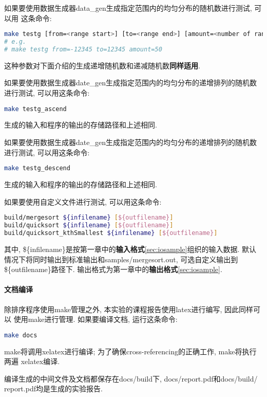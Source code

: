 如果要使用数据生成器data\_gen生成指定范围内的均匀分布的随机数进行测试, 可以用
这条命令:
\begin{lstlisting}[language=bash]
make testg [from=<range start>] [to=<range end>] [amount=<number of random numbers>]
# e.g. 
# make testg from=-12345 to=12345 amount=50
\end{lstlisting}
这种参数对下面介绍的生成递增随机数和递减随机数\textbf{同样适用}.\par

如果要使用数据生成器date\_gen生成指定范围内的均匀分布的递增排列的随机数进行测试,
可以用这条命令:
\begin{lstlisting}[language=bash]
make testg_ascend
\end{lstlisting}
生成的输入和程序的输出的存储路径和上述相同.\par

如果要使用数据生成器date\_gen生成指定范围内的均匀分布的递增排列的随机数进行测试,
可以用这条命令:
\begin{lstlisting}[language=bash]
make testg_descend
\end{lstlisting}
生成的输入和程序的输出的存储路径和上述相同.\par

如果要使用自定义文件进行测试, 可以用这条命令:
\begin{lstlisting}[language=bash]
build/mergesort ${infilename} [${outfilename}]
build/quicksort ${infilename} [${outfilename}]
build/quicksort_kthSmallest ${infilename} [${outfilename}]
\end{lstlisting}
其中, \$\{infilename\}是按第一章中的\textbf{输入格式}\ref{sec:iosample}组织的输入数据.
默认情况下将同时输出到标准输出和samples/mergesort.out, 可选自定义输出到
\$\{outfilename\}路径下. 输出格式为第一章中的\textbf{输出格式}\ref{sec:iosample}.

\paragraph{文档编译}
除排序程序使用make管理之外, 本实验的课程报告使用latex进行编写, 因此同样可以
使用make进行管理. 如果要编译文档, 运行这条命令:
\begin{lstlisting}[language=bash]
make docs
\end{lstlisting}
make将调用xelatex进行编译; 为了确保cross-referencing的正确工作, make将执行两遍
xelatex编译.\par
编译生成的中间文件及文档都保存在docs/build下, docs/report.pdf和docs/build/
report.pdf均是生成的实验报告.

